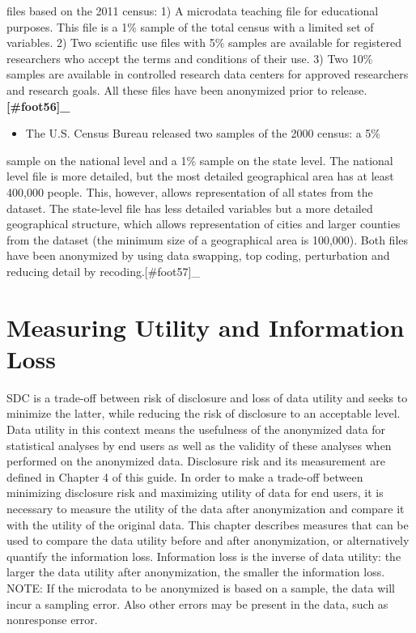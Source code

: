 \documentclass[letterpaper,10pt,english]{sphinxmanual}
\begin{document}
files based on the 2011 census: 1) A microdata teaching file for
educational purposes. This file is a 1\% sample of the total census with
a limited set of variables. 2) Two scientific use files with 5\% samples
are available for registered researchers who accept the terms and
conditions of their use. 3) Two 10\% samples are available in controlled
research data centers for approved researchers and research goals. All
these files have been anonymized prior to release. {\color{red}\bfseries{}{[}\#foot56{]}\_}
\begin{itemize}
\item {} 
The U.S. Census Bureau released two samples of the 2000 census: a 5\%

\end{itemize}

sample on the national level and a 1\% sample on the state level. The
national level file is more detailed, but the most detailed geographical
area has at least 400,000 people. This, however, allows representation
of all states from the dataset. The state-level file has less detailed
variables but a more detailed geographical structure, which allows
representation of cities and larger counties from the dataset (the
minimum size of a geographical area is 100,000). Both files have been
anonymized by using data swapping, top coding, perturbation and reducing
detail by recoding.{[}\#foot57{]}\_


\chapter{Measuring Utility and Information Loss}
\label{\detokenize{utility::doc}}\label{\detokenize{utility:measuring-utility-and-information-loss}}
SDC is a trade-off between risk of disclosure and loss of data utility
and seeks to minimize the latter, while reducing the risk of disclosure
to an acceptable level. Data utility in this context means the
usefulness of the anonymized data for statistical analyses by end users
as well as the validity of these analyses when performed on the
anonymized data. Disclosure risk and its measurement are defined in
Chapter 4 of this guide. In order to make a trade-off between minimizing
disclosure risk and maximizing utility of data for end users, it is
necessary to measure the utility of the data after anonymization and
compare it with the utility of the original data. This chapter describes
measures that can be used to compare the data utility before and after
anonymization, or alternatively quantify the information loss.
Information loss is the inverse of data utility: the larger the data
utility after anonymization, the smaller the information loss. NOTE: If
the microdata to be anonymized is based on a sample, the data will incur
a sampling error. Also other errors may be present in the data, such as
nonresponse error. 
\end{document}

